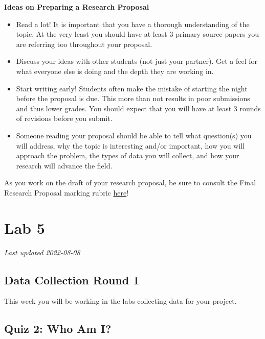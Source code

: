 \documentclass[
]{book}
\providecommand{\tightlist}{%
  \setlength{\itemsep}{0pt}\setlength{\parskip}{0pt}}
\begin{document}
\textbf{Ideas on Preparing a Research Proposal}

\begin{itemize}
\tightlist
\item
  Read a lot! It is important that you have a thorough understanding of the topic. At the very least you should have at least 3 primary source papers you are referring too throughout your proposal.
\item
  Discuss your ideas with other students (not just your partner). Get a feel for what everyone else is doing and the depth they are working in.
\item
  Start writing early! Students often make the mistake of starting the night before the proposal is due. This more than not results in poor submissions and thus lower grades. You should expect that you will have at least 3 rounds of revisions before you submit.
\item
  Someone reading your proposal should be able to tell what question(s) you will address, why the topic is interesting and/or important, how you will approach the problem, the types of data you will collect, and how your research will advance the field.
\end{itemize}

As you work on the draft of your research proposal, be sure to consult the Final Research Proposal marking rubric \href{https://ubco-biology.github.io/BIOL-205-Lab-Manual/research-proposal-rubric.html}{here}!

\hypertarget{part-lab-5}{%
\part*{Lab 5}\label{part-lab-5}}

\emph{Last updated 2022-08-08}

\hypertarget{data-collection-round-1}{%
\chapter*{Data Collection Round 1}\label{data-collection-round-1}}

This week you will be working in the labs collecting data for your project.

\hypertarget{quiz-2-who-am-i}{%
\chapter*{Quiz 2: Who Am I?}\label{quiz-2-who-am-i}}
\end{document}
